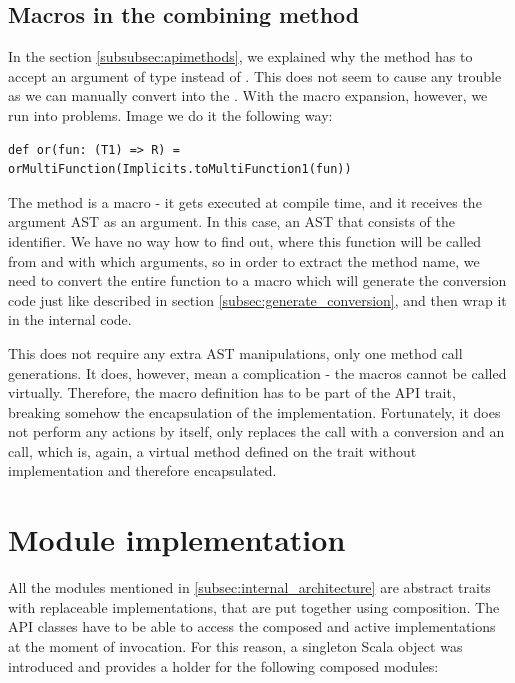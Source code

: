 \subsection{Macros in the combining method}

In the section \ref{subsubsec:apimethods}, we explained why the  method has to accept an argument of  type instead of . This does not seem to cause any trouble as we can manually convert  into the . With the macro expansion, however, we run into problems. Image we do it the following way:
\lstset{style=Scala}
\begin{lstlisting}
def or(fun: (T1) => R) = orMultiFunction(Implicits.toMultiFunction1(fun))
\end{lstlisting}

The   method is a macro - it gets executed at compile time, and it receives the argument AST as an argument. In this case, an AST that consists of the  identifier. We have no way how to find out, where this function will be called from and with which arguments, so in order to extract the method name, we need to convert the entire  function to a macro which will generate the conversion code just like described in section \ref{subsec:generate_conversion}, and then wrap it in the internal  code.

This does not require any extra AST manipulations, only one method call generations. It does, however, mean a complication - the macros cannot be called virtually. Therefore, the macro definition has to be part of the  API trait, breaking somehow the encapsulation of the implementation. Fortunately, it does not perform any actions by itself, only replaces the  call with a conversion and an  call, which is, again, a virtual method defined on the trait without implementation and therefore encapsulated.


\section{Module implementation}
\label{sec:module_impl}

All the modules mentioned in \ref{subsec:internal_architecture} are abstract traits with replaceable implementations, that are put together using composition. The API classes have to be able to access the composed and active implementations at the moment of invocation. For this reason, a singleton Scala object  was introduced and provides a holder for the following composed modules:

